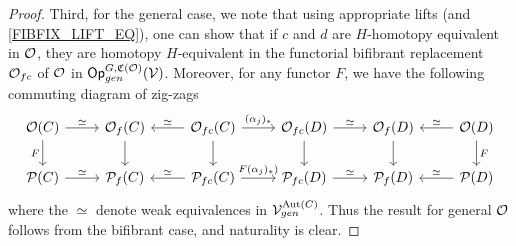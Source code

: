 \documentclass[a4paper,10pt
,draft
]{article}%
\renewcommand{\1}{\eta}%
\begin{document}
\begin{proof}
      Third, for the general case, 
      we note that using appropriate lifts (and \eqref{FIBFIX_LIFT_EQ}), one can show that if $c$ and $d$ are $H$-homotopy equivalent in $\mathcal{O}$, they are
      homotopy $H$-equivalent in the functorial bifibrant replacement $\mathcal{O}_{fc}$ of $\mathcal{O}$ in $\mathsf{Op}^{G, \mathfrak C(\mathcal{O})}_{gen}(\mathcal V)$.
      Moreover, for any functor $F$, we have the following commuting diagram of zig-zags
      \begin{equation}
            \begin{tikzcd}
                  \O(C) \arrow[r, "\simeq"] \arrow[d, "F"']
                  &
                  \O_f(C) \arrow[d]
                  &
                  \O_{fc}(C) \arrow[l, "\simeq"'] \arrow[r, "{(\alpha_j)_{\**}}"] \arrow[d]
                  &
                  \O_{fc}(D) \arrow[r, "\simeq"] \arrow[d]
                  &
                  \O_f(D) \arrow[d]
                  &
                  \O(D) \arrow[l, "\simeq"'] \arrow[d, "F"]
                  \\
                  \P(C) \arrow[r, "\simeq"]
                  &
                  \P_f(C)
                  &
                  \P_{fc}(C) \arrow[l, "\simeq"'] \arrow[r, "{F(\alpha_j)_{\**})}"]
                  &
                  \P_{fc}(D) \arrow[r, "\simeq"] 
                  &
                  \P_f(D) 
                  &
                  \P(D) \arrow[l, "\simeq"']
            \end{tikzcd}
      \end{equation}
      where the $\simeq$ denote weak equivalences in $\mathcal V^{\operatorname{Aut}(C)}_{gen}$.
      Thus the result for general $\mathcal{O}$ follows from the bifibrant case,
      and naturality is clear.


\end{proof}
\end{document}
